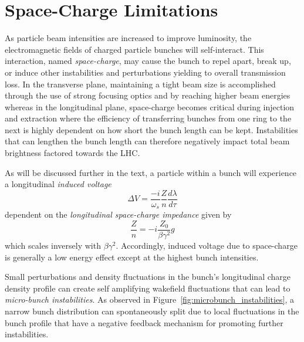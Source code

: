 \section{Space-Charge Limitations}

As particle beam intensities are increased to improve luminosity, the electromagnetic fields of charged particle bunches will self-interact. This interaction, named \textit{space-charge}, may cause the bunch to repel apart, break up, or induce other instabilities and perturbations yielding to overall transmission loss. In the transverse plane, maintaining a tight beam size is accomplished through the use of strong focusing optics and by reaching higher beam energies whereas in the longitudinal plane, space-charge becomes critical during injection and extraction where the efficiency of transferring bunches from one ring to the next is highly dependent on how short the bunch length can be kept. Instabilities that can lengthen the bunch length can therefore negatively impact total beam brightness factored towards the LHC.

As will be discussed further in the text, a particle within a bunch will experience a longitudinal \textit{induced voltage} $$\Delta V = \frac{-i}{\omega_s}\frac{Z}{n}\frac{d\lambda}{d\tau}$$ dependent on the \textit{longitudinal space-charge impedance} given by $$\frac{Z}{n} = -i\frac{Z_0}{\beta\gamma^2}g$$ which scales inversely with $\beta \gamma^2$. Accordingly, induced voltage due to space-charge is generally a low energy effect except at the highest bunch intensities.

Small perturbations and density fluctuations in the bunch's longitudinal charge density profile can create self amplifying wakefield fluctuations that can lead to \textit{micro-bunch instabilities}. As observed in Figure~\ref{fig:microbunch_instabilities}, a narrow bunch distribution can spontaneously split due to local fluctuations in the bunch profile that have a negative feedback mechanism for promoting further instabilities.

